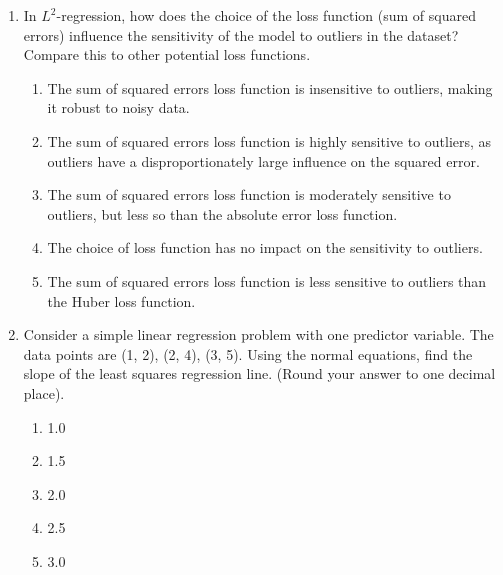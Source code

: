\documentclass{article}%
\begin{document}
\begin{enumerate}
\begin{enumerate}
\item The normal equations are derived by setting the gradient of the loss function to zero and represent a system of linear equations whose solution minimizes the sum of squared errors.%
\item The normal equations are derived by setting the loss function to zero and represent a single equation whose solution minimizes the sum of squared errors.%
\item The normal equations are not directly related to the solution of the $L^2$-regression problem.%
\end{enumerate}%
\vspace{1em}%
\item In $L^2$-regression, how does the choice of the loss function (sum of squared errors) influence the sensitivity of the model to outliers in the dataset? Compare this to other potential loss functions.%
\begin{enumerate}%
\item The sum of squared errors loss function is insensitive to outliers, making it robust to noisy data.%
\item The sum of squared errors loss function is highly sensitive to outliers, as outliers have a disproportionately large influence on the squared error.%
\item The sum of squared errors loss function is moderately sensitive to outliers, but less so than the absolute error loss function.%
\item The choice of loss function has no impact on the sensitivity to outliers.%
\item The sum of squared errors loss function is less sensitive to outliers than the Huber loss function.%
\end{enumerate}%
\vspace{1em}%
\item Consider a simple linear regression problem with one predictor variable.  The data points are (1, 2), (2, 4), (3, 5).  Using the normal equations, find the slope of the least squares regression line. (Round your answer to one decimal place).%
\begin{enumerate}%
\item 1.0%
\item 1.5%
\item 2.0%
\item 2.5%
\item 3.0%
\end{enumerate}%
\vspace{1em}%

\end{enumerate}
\end{document}
